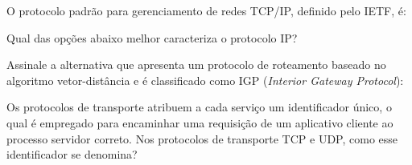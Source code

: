 {
\def\AMCbeginQuestion#1#2{\par\noindent{\bf (POSCOMP 2004 - Questão 68)}}
\begin{question}{} O protocolo padrão para gerenciamento de redes TCP/IP, definido pelo IETF, é:
\begin{choices}
\end{choices}
\end{question}
}
%
{
\def\AMCbeginQuestion#1#2{\par\noindent{\bf (POSCOMP 2004 - Questão 69)}}
\begin{question}{} Qual das opções abaixo melhor caracteriza o protocolo IP?
\begin{choices}
\end{choices}
\end{question}
}
%
{
\def\AMCbeginQuestion#1#2{\par\noindent{\bf (POSCOMP 2004 - Questão 70)}}
\begin{question}{} Assinale a alternativa que apresenta um protocolo de roteamento baseado no algoritmo vetor-distância e é classificado como IGP (\textit{Interior Gateway Protocol}):
\begin{choices}
\end{choices}
\end{question}
}
%
{
\def\AMCbeginQuestion#1#2{\par\noindent{\bf (POSCOMP 2005 - Questão 63)}}
\begin{question}{} Os protocolos de transporte atribuem a cada serviço um identificador único, o qual é empregado para encaminhar uma requisição de um aplicativo cliente ao processo servidor correto. Nos protocolos de transporte TCP e UDP, como esse identificador se denomina?
\begin{choices}
\end{choices}
\end{question}
}
